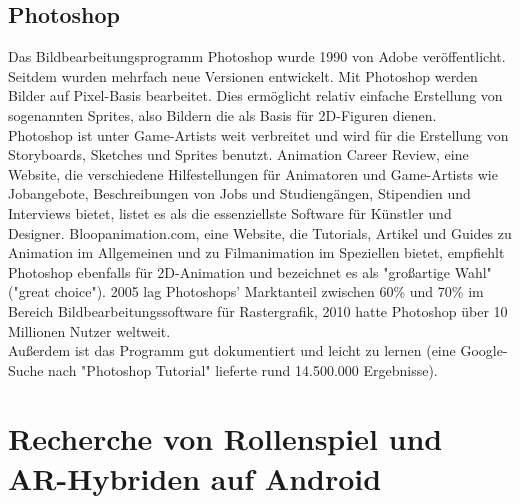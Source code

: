 \documentclass[extern,palatino]{cgBA}
\begin{document}
\subsection{Photoshop}
Das Bildbearbeitungsprogramm Photoshop wurde 1990 von Adobe veröffentlicht\cite{pswiki}. Seitdem wurden mehrfach neue Versionen entwickelt\cite{pswiki}. Mit Photoshop werden Bilder auf Pixel-Basis bearbeitet. Dies ermöglicht relativ einfache Erstellung von sogenannten Sprites, also Bildern die als Basis für 2D-Figuren dienen.
\\
Photoshop ist unter Game-Artists weit verbreitet und wird für die Erstellung von Storyboards, Sketches und Sprites benutzt. Animation Career Review, eine Website, die verschiedene Hilfestellungen für Animatoren und Game-Artists wie Jobangebote, Beschreibungen von Jobs und Studiengängen, Stipendien und Interviews bietet, listet es als die essenziellste Software\cite{psacr} für Künstler und Designer. Bloopanimation.com, eine Website, die Tutorials, Artikel und Guides zu Animation im Allgemeinen und zu Filmanimation im Speziellen bietet, empfiehlt Photoshop ebenfalls für 2D-Animation und bezeichnet es als "großartige Wahl" ("great choice")\cite{psblo}. 2005 lag Photoshops' Marktanteil zwischen 60\% und 70\%\cite{psbka} im Bereich Bildbearbeitungssoftware für Rastergrafik, 2010 hatte Photoshop über 10 Millionen Nutzer weltweit\cite{psbuis}.
\\
Außerdem ist das Programm gut dokumentiert und leicht zu lernen (eine Google-Suche nach "Photoshop Tutorial" lieferte rund 14.500.000 Ergebnisse). 
\newpage
\section{Recherche von Rollenspiel und AR-Hybriden auf Android}\label{re_AR}
\end{document}
